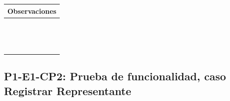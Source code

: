 \documentclass[oneside,10pt]{book}
\begin{document}
\begin{tabularx}{\textwidth}{ X }
\multicolumn{1}{X}{\cellcolor[HTML]{9B9B9B}\textbf{Observaciones}} \\ \hline
\multicolumn{1}{|l|}{ }	\\
\multicolumn{1}{|l|}{ }	\\
\multicolumn{1}{|l|}{ }	\\
\multicolumn{1}{|l|}{ }	\\
\multicolumn{1}{|l|}{ }	\\
\multicolumn{1}{|l|}{ }	\\
\multicolumn{1}{|l|}{ }	\\
\multicolumn{1}{|l|}{ }	\\
\multicolumn{1}{|l|}{ }	\\
\multicolumn{1}{|l|}{ }	\\
\multicolumn{1}{|l|}{ }	\\
\multicolumn{1}{|l|}{ }	\\
\multicolumn{1}{|l|}{ }	\\
\multicolumn{1}{|l|}{ }	\\ \hline
\end{tabularx}
\newpage
\subsection{P1-E1-CP2: Prueba de funcionalidad, caso Registrar Representante}
\end{document}
